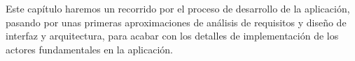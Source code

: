 Este capítulo haremos un recorrido por el proceso de desarrollo de la aplicación, pasando por unas primeras aproximaciones de análisis de requisitos y diseño de interfaz y arquitectura, para
acabar con los detalles de implementación de los actores fundamentales en la aplicación.
